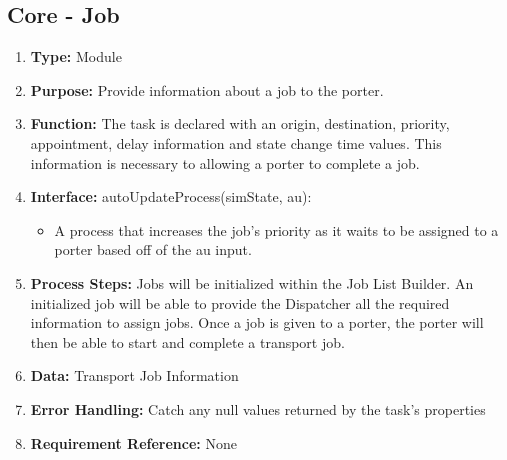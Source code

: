 \documentclass[paper=letter, fontsize=10pt]{scrartcl}
\numberwithin{equation}{section}		%
\numberwithin{figure}{section}			%
\numberwithin{table}{section}				%
\begin{document}
\subsection{Core - Job}
\begin{enumerate}[]
	\item \textbf{Type:} Module
	\item \textbf{Purpose:} Provide information about a job to the porter.
	\item \textbf{Function:} The task is declared with an origin, destination, priority, appointment, delay information and state change time values.  This information is necessary to allowing a porter to complete a job.
	\item \textbf{Interface:} \newline
		autoUpdateProcess(simState, au):
			\begin{itemize}
				\item A process that increases the job's priority as it waits to be assigned to a porter based off of the au input.
			\end{itemize}
	\item \textbf{Process Steps:}  Jobs will be initialized within the Job List Builder.   An initialized job will be able to provide the Dispatcher all the required information to assign jobs.  Once a job is given to a porter, the porter will then be able to start and complete a transport job.
	\item \textbf{Data:} Transport Job Information
	\item \textbf{Error Handling:} Catch any null values returned by the task's properties
	\item \textbf{Requirement Reference:} None
\end{enumerate}
\end{document}
